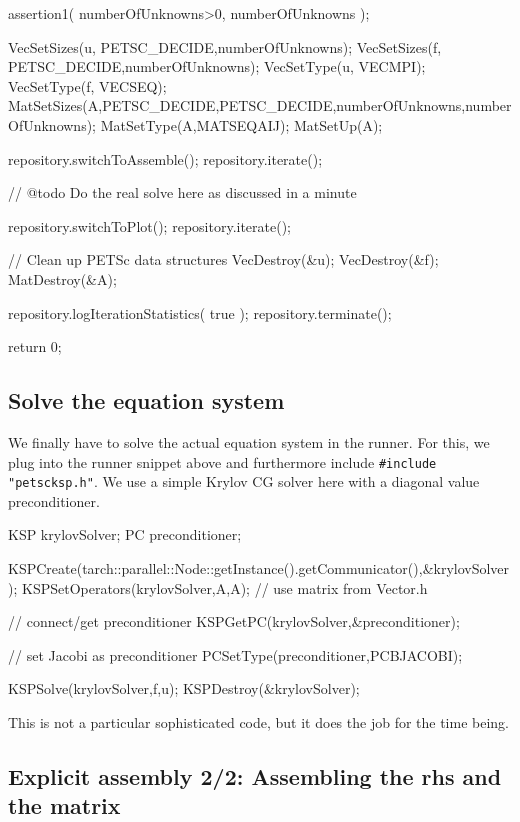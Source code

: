 \begin{code}
{  assertion1( numberOfUnknowns>0, numberOfUnknowns );

  VecSetSizes(u, PETSC_DECIDE,numberOfUnknowns);
  VecSetSizes(f, PETSC_DECIDE,numberOfUnknowns);
  VecSetType(u, VECMPI);
  VecSetType(f, VECSEQ);
  MatSetSizes(A,PETSC_DECIDE,PETSC_DECIDE,numberOfUnknowns,numberOfUnknowns);
  MatSetType(A,MATSEQAIJ);
  MatSetUp(A);
  
  repository.switchToAssemble(); repository.iterate();

  // @todo Do the real solve here as discussed in a minute

  repository.switchToPlot(); repository.iterate();

  // Clean up PETSc data structures
  VecDestroy(&u);
  VecDestroy(&f);
  MatDestroy(&A);

  repository.logIterationStatistics( true );
  repository.terminate();

  return 0;
}
\end{code}




\subsection{Solve the equation system}


We finally have to solve the actual equation system in the runner. For this, we
plug into the runner snippet above and furthermore include
\texttt{\#include "petscksp.h"}. We use a simple Krylov CG solver here with a
diagonal value preconditioner.

\begin{code}
KSP krylovSolver;
PC  preconditioner;

KSPCreate(tarch::parallel::Node::getInstance().getCommunicator(),&krylovSolver);
KSPSetOperators(krylovSolver,A,A); // use matrix from Vector.h

// connect/get preconditioner
KSPGetPC(krylovSolver,&preconditioner);

// set Jacobi as preconditioner
PCSetType(preconditioner,PCBJACOBI);

KSPSolve(krylovSolver,f,u);
KSPDestroy(&krylovSolver);
\end{code}

\noindent
This is not a particular sophisticated code, but it does the job for the time
being.


\subsection{Explicit assembly 2/2: Assembling the rhs and the matrix}

